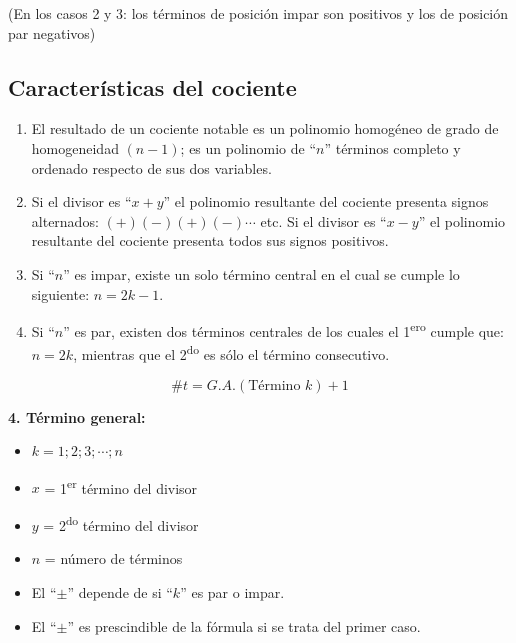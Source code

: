 \documentclass[11pt,a4paper]{article}
\newcommand{\caja}[1]{\fcolorbox{azul}{white}{#1}}
\begin{document}
\begin{center}
\small (En los casos 2 y 3: los términos de posición impar son positivos y los de
posición par negativos)
\end{center}

\subsection*{Características del cociente}
\begin{enumerate}
  \item El resultado de un cociente notable es un polinomio homogéneo de grado de
  homogeneidad $(n-1)$; es un polinomio de ``$n$'' términos completo y ordenado respecto
  de sus dos variables.
  \item Si el divisor es ``$x + y$'' el polinomio resultante del cociente presenta signos
  alternados: $(+)(-)(+)(-)\cdots$ etc. Si el divisor es ``$x - y$'' el polinomio resultante
  del cociente presenta todos sus signos positivos.
  \item Si ``$n$'' es impar, existe un solo término central en el cual se cumple lo
  siguiente: $n = 2k - 1$.
  \item Si ``$n$'' es par, existen dos términos centrales de los cuales el 1\textsuperscript{ero}
  cumple que: $n = 2k$, mientras que el 2\textsuperscript{do} es sólo el término consecutivo.
\end{enumerate}
\[\#t = G.A.(\text{Término } k) + 1\]

\textbf{4. Término general:} \quad \caja{$T_k = \pm\, x^{n-k}\, y^{k-1}$}

\begin{minipage}[t]{0.436\textwidth}
\begin{itemize}[label={}]
  \item $k = 1; 2; 3; \cdots; n$
  \item $x$ = 1\textsuperscript{er} término del divisor
  \item $y$ = 2\textsuperscript{do} término del divisor
  \item $n$ = número de términos
\end{itemize}
\end{minipage}\hfill
\begin{minipage}[t]{0.533\textwidth}
\begin{itemize}[label=\textcolor{magenta}{$\ast$}]
  \item El ``$\pm$'' depende de si ``$k$'' es par o impar.
  \item El ``$\pm$'' es prescindible de la fórmula si se trata del primer caso.
\end{itemize}
\end{minipage}
\end{document}

